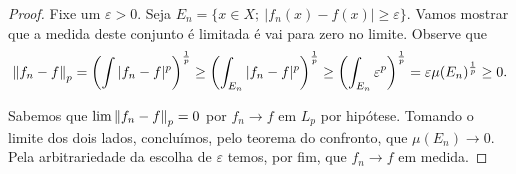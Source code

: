\begin{proof}
    Fixe um $\varepsilon >0$. Seja $E_{n} = \{x\in X ; \ |f_n(x) - f(x)| \geq \varepsilon \}$. Vamos mostrar que a medida deste conjunto é limitada é vai para zero no limite. Observe que 
    \begin{equation*}
        \left\lVert f_n - f \right\rVert_p=\left(\int |f_n - f|^p \right)^{\frac{1}{p}}\geq \left(\int_{E_n} |f_n - f|^p \right)^{\frac{1}{p}} \geq \left(\int_{E_n} \varepsilon^p \right)^{\frac{1}{p}}= \varepsilon \mu(E_n)^{\frac{1}{p}} \geq 0.
    \end{equation*}
    
    Sabemos que $\lim \left\lVert f_n - f \right\rVert_p = 0$ por $f_n\rightarrow f$ em $L_p$ por hipótese. Tomando o limite dos dois lados, concluímos, pelo teorema do confronto, que $\mu(E_{n})\rightarrow 0$. Pela arbitrariedade da escolha de $\varepsilon$ temos, por fim, que $f_n \to f$ em medida.
\end{proof}